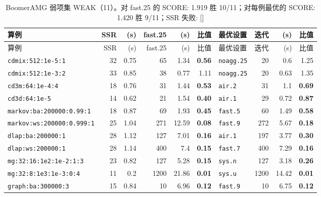 {\scriptsize\setlength{\tabcolsep}{3pt}
\begin{longtable}{lrrrrrlrrr}
\caption{BoomerAMG 弱项集 WEAK（11）。对 fast.25 的 SCORE: 1.919  胜 10/11；对每例最优的 SCORE: 1.420  胜 9/11；SSR 失败: []}\\
\toprule
算例 & SSR & (s) & fast.25 & (s) & 比值 & 最优设置 & 迭代 & (s) & 比值 \\
\midrule
\endfirsthead
\toprule
算例 & SSR & (s) & fast.25 & (s) & 比值 & 最优设置 & 迭代 & (s) & 比值 \\
\midrule
\endhead
\bottomrule
\endlastfoot
\texttt{cdmix:512:1e-5:1} & 32 & 0.75 & 65 & 1.34 & \textbf{0.56} & \texttt{noagg.25} & 20 & 0.6 & 1.25 \\
\texttt{cdmix:512:1e-3:2} & 33 & 0.85 & 38 & 0.77 & 1.11 & \texttt{noagg.25} & 20 & 0.63 & 1.35 \\
\texttt{cd3m:64:1e-4:4} & 18 & 0.76 & 31 & 1.44 & \textbf{0.53} & \texttt{air.2} & 31 & 1.1 & \textbf{0.69} \\
\texttt{cd3d:64:1e-5} & 14 & 0.62 & 21 & 1.54 & \textbf{0.40} & \texttt{air.1} & 29 & 0.72 & \textbf{0.87} \\
\texttt{markov:ba:200000:0.99:1} & 18 & 0.87 & 69 & 1.93 & \textbf{0.45} & \texttt{fast.5} & 60 & 1.49 & \textbf{0.58} \\
\texttt{markov:ws:200000:0.999:1} & 25 & 1.04 & 271 & 12.59 & \textbf{0.08} & \texttt{fast.9} & 272 & 5.67 & \textbf{0.18} \\
\texttt{dlap:ba:200000:1} & 28 & 1.12 & 127 & 7.01 & \textbf{0.16} & \texttt{air.1} & 197 & 3.77 & \textbf{0.30} \\
\texttt{dlap:ws:200000:1} & 28 & 1.14 & 400 & 7.4 & \textbf{0.15} & \texttt{fast.7} & 400 & 7.29 & \textbf{0.16} \\
\texttt{mg:32:16:1e2:1e-2:1:3} & 23 & 0.82 & 127 & 5.28 & \textbf{0.15} & \texttt{sys.n} & 127 & 3.18 & \textbf{0.26} \\
\texttt{mg:32:8:1e3:1e-3:0:4} & 11 & 0.2 & 1200 & 21.86 & \textbf{0.01} & \texttt{sys.u} & 1200 & 14.42 & \textbf{0.01} \\
\texttt{graph:ba:300000:3} & 15 & 0.84 & 10 & 6.96 & \textbf{0.12} & \texttt{fast.9} & 10 & 6.75 & \textbf{0.12} \\
\end{longtable}}
